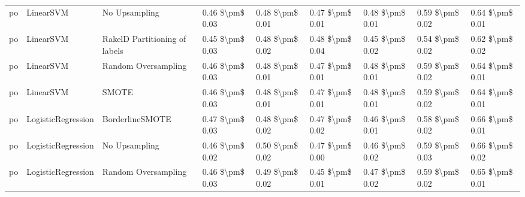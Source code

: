 \begin{tabular}{lllllllll}
      po &                       LinearSVM &                 No Upsampling &     0.46 \$\textbackslash pm\$ 0.03 &           0.48 \$\textbackslash pm\$ 0.01 &       0.47 \$\textbackslash pm\$ 0.01 &        0.48 \$\textbackslash pm\$ 0.01 &                         0.59 \$\textbackslash pm\$ 0.02 &     0.64 \$\textbackslash pm\$ 0.01 \\
      po &                       LinearSVM & RakelD Partitioning of labels &     0.45 \$\textbackslash pm\$ 0.03 &           0.48 \$\textbackslash pm\$ 0.02 &       0.48 \$\textbackslash pm\$ 0.04 &        0.45 \$\textbackslash pm\$ 0.02 &                         0.54 \$\textbackslash pm\$ 0.02 &     0.62 \$\textbackslash pm\$ 0.02 \\
      po &                       LinearSVM &           Random Oversampling &     0.46 \$\textbackslash pm\$ 0.03 &           0.48 \$\textbackslash pm\$ 0.01 &       0.47 \$\textbackslash pm\$ 0.01 &        0.48 \$\textbackslash pm\$ 0.01 &                         0.59 \$\textbackslash pm\$ 0.02 &     0.64 \$\textbackslash pm\$ 0.01 \\
      po &                       LinearSVM &                         SMOTE &     0.46 \$\textbackslash pm\$ 0.03 &           0.48 \$\textbackslash pm\$ 0.01 &       0.47 \$\textbackslash pm\$ 0.01 &        0.48 \$\textbackslash pm\$ 0.01 &                         0.59 \$\textbackslash pm\$ 0.02 &     0.64 \$\textbackslash pm\$ 0.01 \\
      po &              LogisticRegression &               BorderlineSMOTE &     0.47 \$\textbackslash pm\$ 0.03 &           0.48 \$\textbackslash pm\$ 0.02 &       0.47 \$\textbackslash pm\$ 0.02 &        0.46 \$\textbackslash pm\$ 0.01 &                         0.58 \$\textbackslash pm\$ 0.02 &     0.66 \$\textbackslash pm\$ 0.01 \\
      po &              LogisticRegression &                 No Upsampling &     0.46 \$\textbackslash pm\$ 0.02 &           0.50 \$\textbackslash pm\$ 0.02 &       0.47 \$\textbackslash pm\$ 0.00 &        0.46 \$\textbackslash pm\$ 0.02 &                         0.59 \$\textbackslash pm\$ 0.03 &     0.66 \$\textbackslash pm\$ 0.02 \\
      po &              LogisticRegression &           Random Oversampling &     0.46 \$\textbackslash pm\$ 0.03 &           0.49 \$\textbackslash pm\$ 0.02 &       0.45 \$\textbackslash pm\$ 0.01 &        0.47 \$\textbackslash pm\$ 0.02 &                         0.59 \$\textbackslash pm\$ 0.02 &     0.65 \$\textbackslash pm\$ 0.01 \\

\end{tabular}
